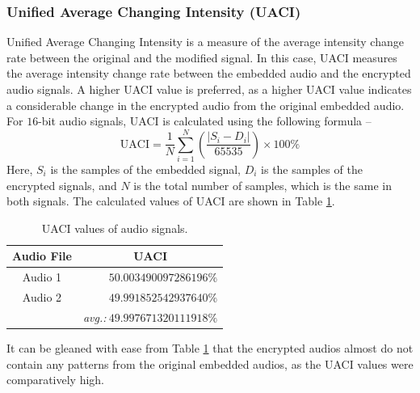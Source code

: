 \documentclass[a4paper]{cas-sc}
\begin{document}
\subsubsection{Unified Average Changing Intensity (UACI)}
Unified Average Changing Intensity is a measure of the average intensity change rate between the original and the modified signal. In this case, UACI measures the average intensity change rate between the embedded audio and the encrypted audio signals. A higher UACI value is preferred, as a higher UACI value indicates a considerable change in the encrypted audio from the original embedded audio. For $16$-bit audio signals, UACI is calculated using the following formula --
\begin{equation}
    \text{UACI}=\frac{1}{N}\sum_{i=1}^{N}\left(\frac{|S_i-D_i|}{65535}\right)\times100\%
\end{equation}
Here, $S_i$ is the samples of the embedded signal, $D_i$ is the samples of the encrypted signals, and $N$ is the total number of samples, which is the same in both signals. The calculated values of UACI are shown in Table \ref{table:uaci}.
\begin{table}[pos=h]
    \begin{center}
        \caption{UACI values of audio signals.}
        \begin{tabular}{cr}
            \hline
            \multicolumn{1}{c|}{Audio File} & \multicolumn{1}{c}{UACI}                       \\ \hline
            \multicolumn{1}{c|}{Audio 1}    & $50.003490097286196\%$                         \\ %
            \multicolumn{1}{c|}{Audio 2}    & $49.991852542937640\%$                         \\ \hline
                                            & \textit{avg.:}$\mathbf{~49.997671320111918\%}$
        \end{tabular}
        \label{table:uaci}
    \end{center}
\end{table}

It can be gleaned with ease from Table \ref{table:uaci} that the encrypted audios almost do not contain any patterns from the original embedded audios, as the UACI values were comparatively high.
\end{document}
